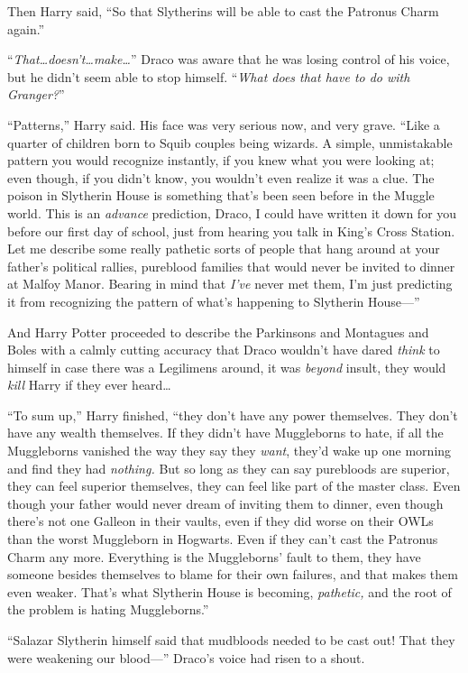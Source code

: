 Then Harry said, “So that Slytherins will be able to cast the Patronus Charm again.”

“\emph{That…doesn’t…make…}” Draco was aware that he was losing control of his voice, but he didn’t seem able to stop himself. “\emph{What does that have to do with Granger?}”

“Patterns,” Harry said. His face was very serious now, and very grave. “Like a quarter of children born to Squib couples being wizards. A simple, unmistakable pattern you would recognize instantly, if you knew what you were looking at; even though, if you didn’t know, you wouldn’t even realize it was a clue. The poison in Slytherin House is something that’s been seen before in the Muggle world. This is an \emph{advance} prediction, Draco, I could have written it down for you before our first day of school, just from hearing you talk in King’s Cross Station. Let me describe some really pathetic sorts of people that hang around at your father’s political rallies, pureblood families that would never be invited to dinner at Malfoy Manor. Bearing in mind that \emph{I’ve} never met them, I’m just predicting it from recognizing the pattern of what’s happening to Slytherin House—”

And Harry Potter proceeded to describe the Parkinsons and Montagues and Boles with a calmly cutting accuracy that Draco wouldn’t have dared \emph{think} to himself in case there was a Legilimens around, it was \emph{beyond} insult, they would \emph{kill} Harry if they ever heard…

“To sum up,” Harry finished, “they don’t have any power themselves. They don’t have any wealth themselves. If they didn’t have Muggleborns to hate, if all the Muggleborns vanished the way they say they \emph{want}, they’d wake up one morning and find they had \emph{nothing.} But so long as they can say purebloods are superior, they can feel superior themselves, they can feel like part of the master class. Even though your father would never dream of inviting them to dinner, even though there’s not one Galleon in their vaults, even if they did worse on their OWLs than the worst Muggleborn in Hogwarts. Even if they can’t cast the Patronus Charm any more. Everything is the Muggleborns’ fault to them, they have someone besides themselves to blame for their own failures, and that makes them even weaker. That’s what Slytherin House is becoming, \emph{pathetic,} and the root of the problem is hating Muggleborns.”

“Salazar Slytherin himself said that mudbloods needed to be cast out! That they were weakening our blood—” Draco’s voice had risen to a shout.

